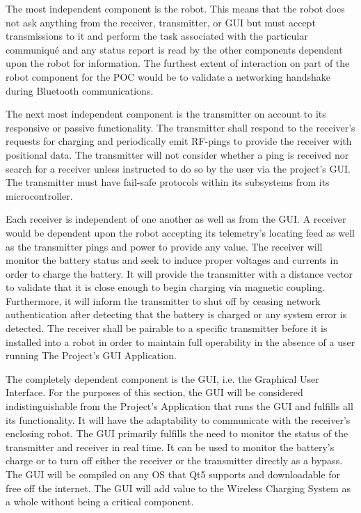 \documentclass[12pt]{article}
\begin{document}
The most independent component is the robot.  This means that the robot does not ask anything from the receiver, transmitter, or GUI but must accept transmissions to it and perform the task associated with the particular communiqué and any status report is read by the other components dependent upon the robot for information.  The furthest extent of interaction on part of the robot component for the POC would be to validate a networking handshake during Bluetooth communications.\\ \indent

The next most independent component is the transmitter on account to its responsive or passive functionality.  The transmitter shall respond to the receiver's requests for charging and periodically emit RF-pings to provide the receiver with positional data.  The transmitter will not consider whether a ping is received nor search for a receiver unless instructed to do so by the user via the project's GUI.  The transmitter must have fail-safe protocols within its subsystems from its microcontroller.\\ \indent

Each receiver is independent of one another as well as from the GUI.  A receiver would be dependent upon the robot accepting its telemetry's locating feed as well as the transmitter pings and power to provide any value.  The receiver will monitor the battery status and seek to induce proper voltages and currents in order to charge the battery.  It will provide the transmitter with a distance vector to validate that it is close enough to begin charging via magnetic coupling.  Furthermore, it will inform the transmitter to shut off by ceasing network authentication after detecting that the battery is charged or any system error is detected. The receiver shall be pairable to a specific transmitter before it is installed into a robot in order to maintain full operability in the absence of a user running The Project's GUI Application.\\  \indent

The completely dependent component is the GUI, i.e. the Graphical User Interface.  For the purposes of this section, the GUI will be considered indistinguishable from the Project's Application that runs the GUI and fulfills all its functionality.  It will have the adaptability to communicate with the receiver's enclosing robot.  The GUI primarily fulfills the need to monitor the status of the transmitter and receiver in real time.  It can be used to monitor the battery's charge or to turn off either the receiver or the transmitter directly as a bypass.  The GUI will be compiled on any OS that Qt5 supports and downloadable for free off the internet.  The GUI will add value to the Wireless Charging System as a whole without being a critical component.
\end{document}
